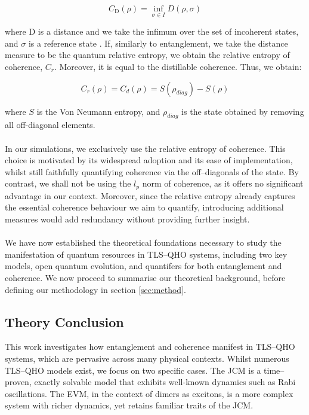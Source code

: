 \documentclass[12pt]{article}
\begin{document}
\begin{equation}
    C_{\scriptscriptstyle\text{D}}(\rho) = \inf_{\sigma \in I} D(\rho,\sigma)
\end{equation}

where D is a distance and we take the infimum over the set of incoherent states, and $\sigma$ is a reference state \cite{Coherence2017-Colloquium}. If, similarly to entanglement, we take the distance measure to be the quantum relative entropy, we obtain the relative entropy of coherence, $C_r$. Moreover, it is equal to the distillable coherence. Thus, we obtain:

\begin{equation} \label{rel_ent_coh}
C_r(\rho) = C_d(\rho) = S(\rho_{diag}) - S(\rho)
\end{equation}

where $S$ is the Von Neumann entropy, and $\rho_{diag}$ is the state obtained by removing all off-diagonal elements. \\
\\
In our simulations, we exclusively use the relative entropy of coherence. This choice is motivated by its widespread adoption and its ease of implementation, whilst still faithfully quantifying coherence via the off--diagonals of the state. By contrast, we shall not be using the $l_p$ norm of coherence, as it offers no significant advantage in our context. Moreover, since the relative entropy already captures the essential coherence behaviour we aim to quantify, introducing additional measures would add redundancy without providing further insight.\\
\\
We have now established the theoretical foundations necessary to study the manifestation of quantum resources in TLS--QHO systems, including two key models, open quantum evolution, and quantifers for both entanglement and coherence. We now proceed to summarise our theoretical background, before defining our methodology in section \ref{sec:method}.
\subsection{Theory Conclusion}

This work investigates how entanglement and coherence manifest in TLS--QHO systems, which are pervasive across many physical contexts. Whilst numerous TLS--QHO models exist, we focus on two specific cases. The JCM is a time--proven, exactly solvable model that exhibits well-known dynamics such as Rabi oscillations. The EVM, in the context of dimers as excitons, is a more complex system with richer dynamics, yet retains familiar traits of the JCM.
\end{document}
